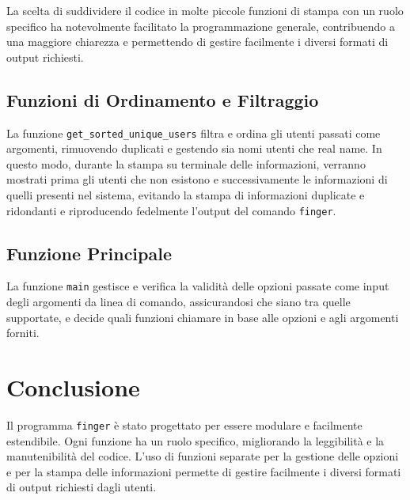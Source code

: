 La scelta di suddividere il codice in molte piccole funzioni di stampa con un ruolo specifico ha notevolmente facilitato la programmazione generale, contribuendo a una maggiore chiarezza e permettendo di gestire facilmente i diversi formati di output richiesti.

\subsection{Funzioni di Ordinamento e Filtraggio}

La funzione \texttt{get\_sorted\_unique\_users} filtra e ordina gli utenti passati come argomenti, rimuovendo duplicati e gestendo sia nomi utenti che real name. In questo modo, durante la stampa su terminale delle informazioni, verranno mostrati prima gli utenti che non esistono e successivamente le informazioni di quelli presenti nel sistema, evitando la stampa di informazioni duplicate e ridondanti e  riproducendo fedelmente l'output del comando \texttt{finger}.

\subsection{Funzione Principale}

La funzione \texttt{main} gestisce e verifica la validità delle opzioni passate come input degli argomenti da linea di comando, assicurandosi che siano tra quelle supportate, e decide quali funzioni chiamare in base alle opzioni e agli argomenti forniti.

\section{Conclusione}

Il programma \texttt{finger} è stato progettato per essere modulare e facilmente estendibile. Ogni funzione ha un ruolo specifico, migliorando la leggibilità e la manutenibilità del codice. L'uso di funzioni separate per la gestione delle opzioni e per la stampa delle informazioni permette di gestire facilmente i diversi formati di output richiesti dagli utenti.
